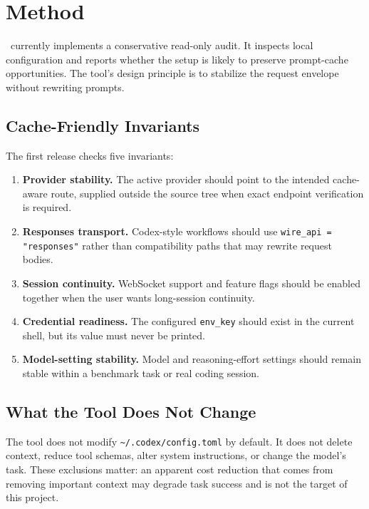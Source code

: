 \section{Method}
\label{sec:method}

\toolname\ currently implements a conservative read-only audit. It inspects local configuration and reports whether the setup is likely to preserve prompt-cache opportunities. The tool's design principle is to stabilize the request envelope without rewriting prompts.

\subsection{Cache-Friendly Invariants}

The first release checks five invariants:
\begin{enumerate}[leftmargin=2em]
    \item \textbf{Provider stability.} The active provider should point to the intended cache-aware route, supplied outside the source tree when exact endpoint verification is required.
    \item \textbf{Responses transport.} Codex-style workflows should use \texttt{wire\_api = "responses"} rather than compatibility paths that may rewrite request bodies.
    \item \textbf{Session continuity.} WebSocket support and feature flags should be enabled together when the user wants long-session continuity.
    \item \textbf{Credential readiness.} The configured \texttt{env\_key} should exist in the current shell, but its value must never be printed.
    \item \textbf{Model-setting stability.} Model and reasoning-effort settings should remain stable within a benchmark task or real coding session.
\end{enumerate}

\subsection{What the Tool Does Not Change}

The tool does not modify \texttt{\textasciitilde/.codex/config.toml} by default. It does not delete context, reduce tool schemas, alter system instructions, or change the model's task. These exclusions matter: an apparent cost reduction that comes from removing important context may degrade task success and is not the target of this project.

